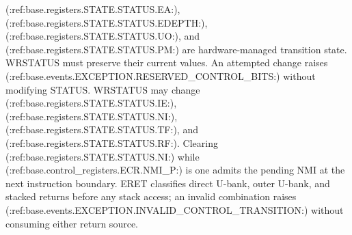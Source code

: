 (:ref:base.registers.STATE.STATUS.EA:), (:ref:base.registers.STATE.STATUS.EDEPTH:), (:ref:base.registers.STATE.STATUS.UO:), and (:ref:base.registers.STATE.STATUS.PM:) are hardware-managed transition state. WRSTATUS must preserve
their current values. An attempted change raises (:ref:base.events.EXCEPTION.RESERVED_CONTROL_BITS:) without modifying STATUS. WRSTATUS may
change (:ref:base.registers.STATE.STATUS.IE:), (:ref:base.registers.STATE.STATUS.NI:), (:ref:base.registers.STATE.STATUS.TF:), and (:ref:base.registers.STATE.STATUS.RF:). Clearing (:ref:base.registers.STATE.STATUS.NI:) while (:ref:base.control_registers.ECR.NMI_P:) is one admits the pending NMI at the next instruction
boundary. ERET classifies direct U-bank, outer U-bank, and stacked returns before any stack access; an invalid
combination raises (:ref:base.events.EXCEPTION.INVALID_CONTROL_TRANSITION:) without consuming either return source.

\clearpage
